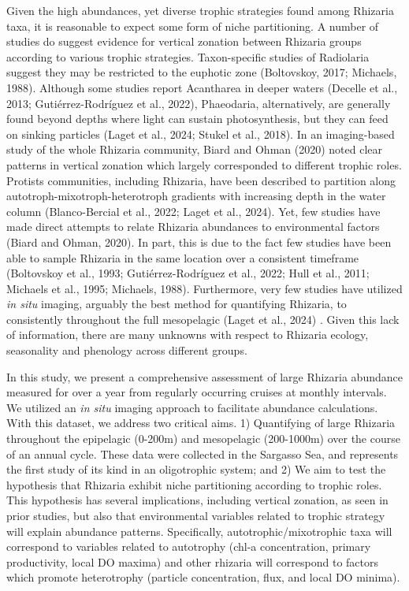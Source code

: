 \documentclass[
]{article}
\begin{document}
Given the high abundances, yet diverse trophic strategies found among
Rhizaria taxa, it is reasonable to expect some form of niche
partitioning. A number of studies do suggest evidence for vertical
zonation between Rhizaria groups according to various trophic
strategies. Taxon-specific studies of Radiolaria suggest they may be
restricted to the euphotic zone (Boltovskoy, 2017; Michaels, 1988).
Although some studies report Acantharea in deeper waters (Decelle et
al., 2013; Gutiérrez-Rodríguez et al., 2022), Phaeodaria, alternatively,
are generally found beyond depths where light can sustain
photosynthesis, but they can feed on sinking particles (Laget et al.,
2024; Stukel et al., 2018). In an imaging-based study of the whole
Rhizaria community, Biard and Ohman (2020) noted clear patterns in
vertical zonation which largely corresponded to different trophic roles.
Protists communities, including Rhizaria, have been described to
partition along autotroph-mixotroph-heterotroph gradients with
increasing depth in the water column (Blanco-Bercial et al., 2022; Laget
et al., 2024). Yet, few studies have made direct attempts to relate
Rhizaria abundances to environmental factors (Biard and Ohman, 2020). In
part, this is due to the fact few studies have been able to sample
Rhizaria in the same location over a consistent timeframe (Boltovskoy et
al., 1993; Gutiérrez-Rodríguez et al., 2022; Hull et al., 2011; Michaels
et al., 1995; Michaels, 1988). Furthermore, very few studies have
utilized \emph{in situ} imaging, arguably the best method for
quantifying Rhizaria, to consistently throughout the full mesopelagic
(Laget et al., 2024) . Given this lack of information, there are many
unknowns with respect to Rhizaria ecology, seasonality and phenology
across different groups.

In this study, we present a comprehensive assessment of large Rhizaria
abundance measured for over a year from regularly occurring cruises at
monthly intervals. We utilized an \emph{in situ} imaging approach to
facilitate abundance calculations. With this dataset, we address two
critical aims. 1) Quantifying of large Rhizaria throughout the
epipelagic (0-200m) and mesopelagic (200-1000m) over the course of an
annual cycle. These data were collected in the Sargasso Sea, and
represents the first study of its kind in an oligotrophic system; and 2)
We aim to test the hypothesis that Rhizaria exhibit niche partitioning
according to trophic roles. This hypothesis has several implications,
including vertical zonation, as seen in prior studies, but also that
environmental variables related to trophic strategy will explain
abundance patterns. Specifically, autotrophic/mixotrophic taxa will
correspond to variables related to autotrophy (chl-a concentration,
primary productivity, local DO maxima) and other rhizaria will
correspond to factors which promote heterotrophy (particle
concentration, flux, and local DO minima).
\end{document}

